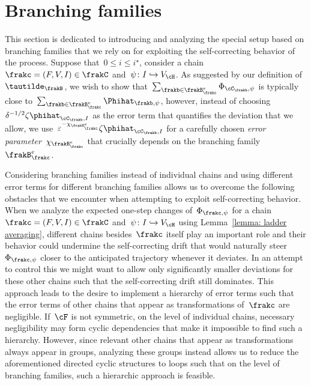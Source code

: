 \documentclass[11pt]{amsart}
\newcommand{\eps}{\varepsilon}
\newcommand{\injection}{\hookrightarrow}
\theoremstyle{definition}
\numberwithin{equation}{section}
\begin{document}
	\section{Branching families}\label{section: branching families}
	
	This section is dedicated to introducing and analyzing the special setup based on branching families that we rely on for exploiting the self-correcting behavior of the process.
	Suppose that~$0\leq i\leq i^\star$, consider a chain~$\frakc=(F,V,I)\in\frakC$ and~$\psi\colon I\injection V_\cH$.
	As suggested by our definition of~$\tautilde_\frakB$, we wish to show that~$\sum_{\frakb\in\frakB_\frakc^e}\Phi_{\cC_\frakb,\psi}$ is typically close to~$\sum_{\frakb\in\frakB_\frakc^e}\Phihat_{\frakb,\psi}$, however, instead of choosing~$\delta^{-1/2}\zeta\phihat_{\cC_\frakb,I}$ as the error term that quantifies the deviation that we allow, we use~$\eps^{-\chi_{\frakB_\frakc^e}}\zeta\phihat_{\cC_\frakb,I}$ for a carefully chosen \emph{error parameter}~$\chi_{\frakB_\frakc^e}$ that crucially depends on the branching family~$\frakB_\frakc^e$.
	
	Considering branching families instead of individual chains and using different error terms for different branching families allows us to overcome the following obstacles that we encounter when attempting to exploit self-correcting behavior.
	When we analyze the expected one-step changes of~$\Phi_{\frakc,\psi}$ for a chain~$\frakc=(F,V,I)\in\frakC$ and~$\psi\colon I\injection V_\cH$ using Lemma~\ref{lemma: ladder averaging}, different chains besides~$\frakc$ itself play an important role and their behavior could undermine the self-correcting drift that would naturally steer~$\Phi_{\frakc,\psi}$ closer to the anticipated trajectory whenever it deviates.
	In an attempt to control this we might want to allow only significantly smaller deviations for these other chains such that the self-correcting drift still dominates.
	This approach leads to the desire to implement a hierarchy of error terms such that the error terms of other chains that appear as transformations of~$\frakc$ are negligible.
	If~$\cF$ is not symmetric, on the level of individual chains, necessary negligibility may form cyclic dependencies that make it impossible to find such a hierarchy.
	However, since relevant other chains that appear as transformations always appear in groups, analyzing these groups instead allows us to reduce the aforementioned directed cyclic structures to loops such that on the level of branching families, such a hierarchic approach is feasible.
	
\end{document}
